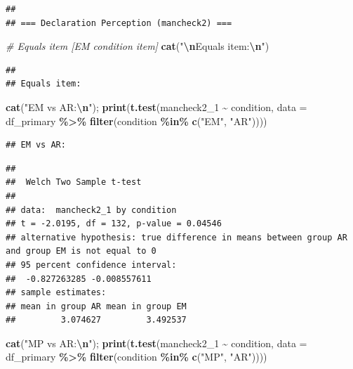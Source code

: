 \documentclass[
]{article}
\newenvironment{Shaded}{\begin{snugshade}}{\end{snugshade}}
\newcommand{\AttributeTok}[1]{\textcolor[rgb]{0.13,0.29,0.53}{#1}}
\newcommand{\CommentTok}[1]{\textcolor[rgb]{0.56,0.35,0.01}{\textit{#1}}}
\newcommand{\FunctionTok}[1]{\textcolor[rgb]{0.13,0.29,0.53}{\textbf{#1}}}
\newcommand{\NormalTok}[1]{#1}
\newcommand{\SpecialCharTok}[1]{\textcolor[rgb]{0.81,0.36,0.00}{\textbf{#1}}}
\newcommand{\StringTok}[1]{\textcolor[rgb]{0.31,0.60,0.02}{#1}}
\begin{document}
\begin{verbatim}
## 
## === Declaration Perception (mancheck2) ===
\end{verbatim}

\begin{Shaded}
\begin{Highlighting}[]
\CommentTok{\# Equals item [EM condition item]}
\FunctionTok{cat}\NormalTok{(}\StringTok{"}\SpecialCharTok{\textbackslash{}n}\StringTok{Equals item:}\SpecialCharTok{\textbackslash{}n}\StringTok{"}\NormalTok{)}
\end{Highlighting}
\end{Shaded}

\begin{verbatim}
## 
## Equals item:
\end{verbatim}

\begin{Shaded}
\begin{Highlighting}[]
\FunctionTok{cat}\NormalTok{(}\StringTok{"EM vs AR:}\SpecialCharTok{\textbackslash{}n}\StringTok{"}\NormalTok{); }\FunctionTok{print}\NormalTok{(}\FunctionTok{t.test}\NormalTok{(mancheck2\_1 }\SpecialCharTok{\textasciitilde{}}\NormalTok{ condition, }
       \AttributeTok{data =}\NormalTok{ df\_primary }\SpecialCharTok{\%\textgreater{}\%} \FunctionTok{filter}\NormalTok{(condition }\SpecialCharTok{\%in\%} \FunctionTok{c}\NormalTok{(}\StringTok{"EM"}\NormalTok{, }\StringTok{"AR"}\NormalTok{))))}
\end{Highlighting}
\end{Shaded}

\begin{verbatim}
## EM vs AR:
\end{verbatim}

\begin{verbatim}
## 
##  Welch Two Sample t-test
## 
## data:  mancheck2_1 by condition
## t = -2.0195, df = 132, p-value = 0.04546
## alternative hypothesis: true difference in means between group AR and group EM is not equal to 0
## 95 percent confidence interval:
##  -0.827263285 -0.008557611
## sample estimates:
## mean in group AR mean in group EM 
##         3.074627         3.492537
\end{verbatim}

\begin{Shaded}
\begin{Highlighting}[]
\FunctionTok{cat}\NormalTok{(}\StringTok{"MP vs AR:}\SpecialCharTok{\textbackslash{}n}\StringTok{"}\NormalTok{); }\FunctionTok{print}\NormalTok{(}\FunctionTok{t.test}\NormalTok{(mancheck2\_1 }\SpecialCharTok{\textasciitilde{}}\NormalTok{ condition, }
       \AttributeTok{data =}\NormalTok{ df\_primary }\SpecialCharTok{\%\textgreater{}\%} \FunctionTok{filter}\NormalTok{(condition }\SpecialCharTok{\%in\%} \FunctionTok{c}\NormalTok{(}\StringTok{"MP"}\NormalTok{, }\StringTok{"AR"}\NormalTok{))))}
\end{Highlighting}
\end{Shaded}
\end{document}
